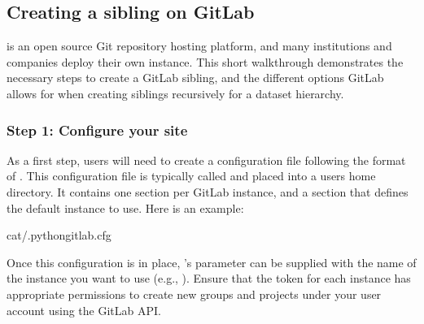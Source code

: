 \subsection{Creating a sibling on GitLab}
\label{\detokenize{basics/101-139-hostingservices:creating-a-sibling-on-gitlab}}\label{\detokenize{basics/101-139-hostingservices:gitlab}}
\sphinxAtStartPar
{\hyperref[\detokenize{glossary:term-GitLab}]{}} is an open source Git repository hosting platform, and many institutions and companies deploy their own instance.
This short walk\sphinxhyphen{}through demonstrates the necessary steps to create a GitLab sibling, and the different options GitLab allows for when creating siblings recursively for a dataset hierarchy.


\subsubsection{Step 1: Configure your site}
\label{\detokenize{basics/101-139-hostingservices:step-1-configure-your-site}}
\sphinxAtStartPar
As a first step, users will need to create a configuration file following the format of .
This configuration file is typically called  and placed into a users home directory.
It contains one section per GitLab instance, and a \sphinxcode{\sphinxupquote{{[}global{]}}} section that defines the default instance to use.
Here is an example:

\begin{sphinxVerbatim}[commandchars=\\\{\}]
cat\PYGZti{}/.python\PYGZhy{}gitlab.cfg


\end{sphinxVerbatim}

\sphinxAtStartPar
Once this configuration is in place, ’s  parameter can be supplied with the name of the instance you want to use (e.g., ).
Ensure that the token for each instance has appropriate permissions to create new groups and projects under your user account using the GitLab API.

